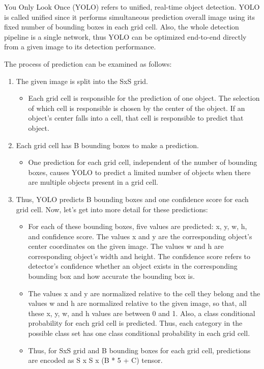 \documentclass{article}
\begin{document}
\setlength{\parindent}{6ex}

\indent

You Only Look Once (YOLO) \cite{yolocite} refers to unified, real-time object detection. 
YOLO is called unified since it performs simultaneous prediction overall image using its 
fixed number of bounding boxes in each grid cell. Also, the whole detection pipeline is a 
single network, thus YOLO can be optimized end-to-end directly from a given image to its 
detection performance. \par

The process of prediction can be examined as follows:
\begin{enumerate}
    \item The given image is split into the SxS grid.
    \begin{itemize}
        \item Each grid cell is responsible for the prediction of one object.
The selection of which cell is responsible is chosen by the center of 
the object. If an object's center falls into a cell, that cell is 
responsible to predict that object.
    \end{itemize}
    \item Each grid cell has B bounding boxes to make a prediction.
    \begin{itemize}
        \item One prediction for each grid cell, independent of the number of 
bounding boxes, causes YOLO to predict a limited number of objects when 
there are multiple objects present in a grid cell.
    \end{itemize}
    \item Thus, YOLO predicts B bounding boxes and one confidence score for 
each grid cell. Now, let's get into more detail for these predictions:
    \begin{itemize}
        \item For each of these bounding boxes, five values are predicted:
x, y, w, h, and confidence score. The values x and y are the corresponding object's 
center coordinates on the given image. The values w and h are corresponding object's 
width and height. The confidence score refers to detector's confidence whether an 
object exists in the corresponding bounding box and how accurate the bounding box is.
        \item The values x and y are normalized relative to the cell they belong and 
the values w and h are normalized relative to the given image, so that, all these 
x, y, w, and h values are between 0 and 1. Also, a class conditional probability for 
each grid cell is predicted. Thus, each category in the possible class set has one 
class conditional probability in each grid cell. 
        \item Thus, for SxS grid and B bounding boxes for each grid cell, 
predictions are encoded as S x S x (B * 5 + C) tensor.
    \end{itemize}
\end{enumerate}
\end{document}

